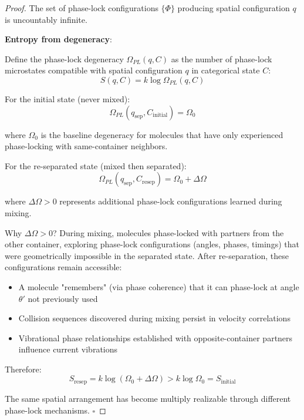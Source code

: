 \documentclass[12pt,a4paper]{article}
\theoremstyle{remark}
\begin{document}
\begin{proof}
The set of phase-lock configurations $\{\Phi\}$ producing spatial configuration $q$ is uncountably infinite.

\textbf{Entropy from degeneracy}:

Define the phase-lock degeneracy $\Omega_{PL}(q, C)$ as the number of phase-lock microstates compatible with spatial configuration $q$ in categorical state $C$:
\begin{equation}
S(q, C) = k \log \Omega_{PL}(q, C)
\end{equation}

For the initial state (never mixed):
\begin{equation}
\Omega_{PL}(q_{\text{sep}}, C_{\text{initial}}) = \Omega_0
\end{equation}

where $\Omega_0$ is the baseline degeneracy for molecules that have only experienced phase-locking with same-container neighbors.

For the re-separated state (mixed then separated):
\begin{equation}
\Omega_{PL}(q_{\text{sep}}, C_{\text{resep}}) = \Omega_0 + \Delta\Omega
\end{equation}

where $\Delta\Omega > 0$ represents additional phase-lock configurations learned during mixing.

Why $\Delta\Omega > 0$? During mixing, molecules phase-locked with partners from the other container, exploring phase-lock configurations (angles, phases, timings) that were geometrically impossible in the separated state. After re-separation, these configurations remain accessible:
\begin{itemize}
\item A molecule "remembers" (via phase coherence) that it can phase-lock at angle $\theta'$ not previously used
\item Collision sequences discovered during mixing persist in velocity correlations
\item Vibrational phase relationships established with opposite-container partners influence current vibrations
\end{itemize}

Therefore:
\begin{equation}
S_{\text{resep}} = k \log(\Omega_0 + \Delta\Omega) > k \log \Omega_0 = S_{\text{initial}}
\end{equation}

The same spatial arrangement has become multiply realizable through different phase-lock mechanisms. $\square$
\end{proof}
\end{document}
